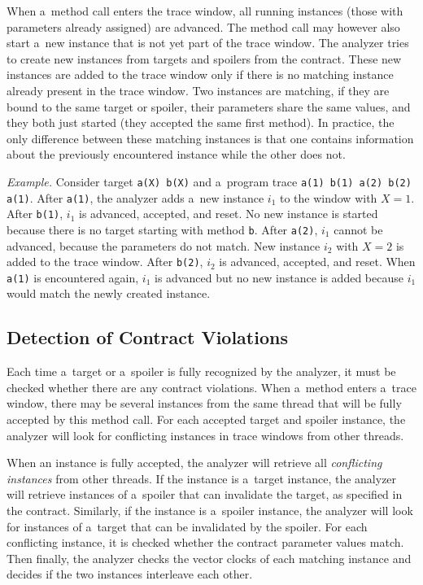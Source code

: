 When a~method call enters the trace window, all running instances (those with
parameters already assigned) are advanced. The method call may however also
start a~new instance that is not yet part of the trace window. The analyzer
tries to create new instances from targets and spoilers from the contract. These
new instances are added to the trace window only if there is no matching
instance already present in the trace window. Two instances are matching, if
they are bound to the same target or spoiler, their parameters share the same
values, and they both just started (they accepted the same first method). In
practice, the only difference between these matching instances is that one
contains information about the previously encountered instance while the other
does not.

\medskip \noindent
\emph{Example.} Consider target \texttt{a(X) b(X)} and a~program trace
\texttt{a(1) b(1) a(2) b(2) a(1)}. After \texttt{a(1)}, the analyzer adds a~new
instance $i_1$ to the window with $X=1$. After \texttt{b(1)}, $i_1$ is advanced,
accepted, and reset. No new instance is started because there is no target
starting with method \texttt{b}. After \texttt{a(2)}, $i_1$ cannot be advanced,
because the parameters do not match. New instance $i_2$ with $X=2$ is added to
the trace window. After \texttt{b(2)}, $i_2$ is advanced, accepted, and reset.
When \texttt{a(1)} is encountered again, $i_1$ is advanced but no new instance
is added because $i_1$ would match the newly created instance.

\subsection{Detection of Contract Violations}
\label{violations}

Each time a~target or a~spoiler is fully recognized by the analyzer, it must be
checked whether there are any contract violations. When a~method enters a~trace
window, there may be several instances from the same thread that will be fully
accepted by this method call. For each accepted target and spoiler instance, the
analyzer will look for conflicting instances in trace windows from other
threads.

When an instance is fully accepted, the analyzer will retrieve all
\emph{conflicting instances} from other threads. If the instance is a~target
instance, the analyzer will retrieve instances of a~spoiler that can invalidate
the target, as specified in the contract. Similarly, if the instance is
a~spoiler instance, the analyzer will look for instances of a~target that can be
invalidated by the spoiler. For each conflicting instance, it is checked whether
the contract parameter values match. Then finally, the analyzer checks the
vector clocks of each matching instance and decides if the two instances
interleave each other.


